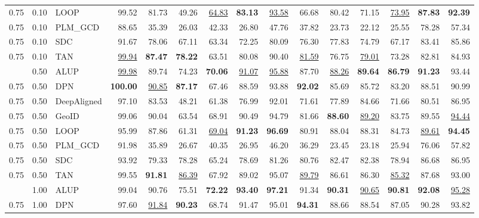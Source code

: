 \begin{table}[t]
{\begin{tabular}{lllrrrrrrrrrrrr}
0.75 & 0.10 & LOOP & 99.52 & 81.73 & 49.26 & \underline{64.83} & \textbf{83.13} & \underline{93.58} & 66.68 & 80.42 & 71.15 & \underline{73.95} & \textbf{87.83} & \textbf{92.39} \\
0.75 & 0.10 & PLM_GCD & 88.65 & 35.39 & 26.03 & 42.33 & 26.80 & 47.76 & 37.82 & 23.73 & 22.12 & 25.55 & 78.28 & 57.34 \\
0.75 & 0.10 & SDC & 91.67 & 78.06 & 67.11 & 63.34 & 72.25 & 80.09 & 76.30 & 77.83 & 74.79 & 67.17 & 83.41 & 85.86 \\
0.75 & 0.10 & TAN & \underline{99.94} & \textbf{87.47} & \textbf{78.22} & 63.51 & 80.08 & 90.40 & \underline{81.59} & 76.75 & \underline{79.01} & 73.28 & 82.81 & 84.93 \\
\addlinespace
0.75 & 0.50 & ALUP & \underline{99.98} & 89.74 & 74.23 & \textbf{70.06} & \underline{91.07} & \underline{95.88} & 87.70 & \underline{88.26} & \textbf{89.64} & \textbf{86.79} & \textbf{91.23} & 93.44 \\
0.75 & 0.50 & DPN & \textbf{100.00} & \underline{90.85} & \textbf{87.17} & 67.46 & 88.59 & 93.88 & \textbf{92.02} & 85.69 & 85.72 & 83.20 & 88.51 & 90.99 \\
0.75 & 0.50 & DeepAligned & 97.10 & 83.53 & 48.21 & 61.38 & 76.99 & 92.01 & 71.61 & 77.89 & 84.66 & 71.66 & 80.51 & 86.95 \\
0.75 & 0.50 & GeoID & 99.06 & 90.04 & 63.54 & 68.91 & 90.49 & 94.79 & 81.66 & \textbf{88.60} & \underline{89.20} & 83.75 & 89.55 & \underline{94.44} \\
0.75 & 0.50 & LOOP & 95.99 & 87.86 & 61.31 & \underline{69.04} & \textbf{91.23} & \textbf{96.69} & 80.91 & 88.04 & 88.31 & 84.73 & \underline{89.61} & \textbf{94.45} \\
0.75 & 0.50 & PLM_GCD & 91.98 & 35.89 & 26.67 & 40.35 & 26.95 & 46.20 & 36.29 & 23.45 & 23.18 & 25.94 & 76.06 & 57.82 \\
0.75 & 0.50 & SDC & 93.92 & 79.33 & 78.28 & 65.24 & 78.69 & 81.26 & 80.76 & 82.47 & 82.38 & 78.94 & 86.68 & 86.95 \\
0.75 & 0.50 & TAN & 99.55 & \textbf{91.81} & \underline{86.39} & 67.92 & 89.02 & 95.07 & \underline{89.79} & 86.61 & 86.30 & \underline{85.32} & 87.68 & 93.00 \\
\addlinespace
0.75 & 1.00 & ALUP & 99.04 & 90.76 & 75.51 & \textbf{72.22} & \textbf{93.40} & \textbf{97.21} & 91.34 & \textbf{90.31} & \underline{90.65} & \textbf{90.81} & \textbf{92.08} & \underline{95.28} \\
0.75 & 1.00 & DPN & 97.60 & \underline{91.84} & \textbf{90.23} & 68.74 & 91.47 & 95.01 & \textbf{94.31} & 88.66 & 88.54 & 87.05 & 90.28 & 93.82 \\

\end{tabular}}
\end{table}
